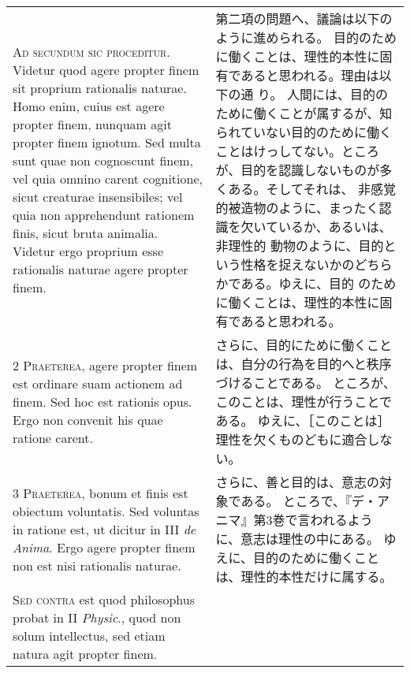 \documentclass[10pt]{jsarticle} %
\begin{document}
\begin{longtable}{p{21em}p{21em}}



{\Huge A}{\scshape d secundum sic proceditur}. Videtur
quod agere propter finem sit proprium rationalis naturae. Homo enim,
cuius est agere propter finem, nunquam agit propter finem ignotum. Sed
multa sunt quae non cognoscunt finem, vel quia omnino carent cognitione,
sicut creaturae insensibiles; vel quia non apprehendunt rationem finis,
sicut bruta animalia. Videtur ergo proprium esse rationalis naturae
agere propter finem.


&


第二項の問題へ、議論は以下のように進められる。
目的のために働くことは、理性的本性に固有であると思われる。理由は以下の通
 り。
人間には、目的のために働くことが属するが、知られていない目的のために働く
 ことはけっしてない。ところが、目的を認識しないものが多くある。そしてそれは、
 非感覚的被造物のように、まったく認識を欠いているか、あるいは、非理性的
 動物のように、目的という性格を捉えないかのどちらかである。ゆえに、目的
 のために働くことは、理性的本性に固有であると思われる。


\\


{\scshape 2 Praeterea}, agere propter finem est
ordinare suam actionem ad finem. Sed hoc est rationis opus. Ergo non
convenit his quae ratione carent.


&


さらに、目的にために働くことは、自分の行為を目的へと秩序づけることである。
ところが、このことは、理性が行うことである。
ゆえに、［このことは］理性を欠くものどもに適合しない。

\\


{\scshape 3 Praeterea}, bonum et finis est obiectum
voluntatis. Sed voluntas in ratione est, ut dicitur in III {\itshape de
Anima}. Ergo agere propter finem non est nisi rationalis naturae.


&

さらに、善と目的は、意志の対象である。
ところで、『デ・アニマ』第3巻で言われるように、意志は理性の中にある。
ゆえに、目的のために働くことは、理性的本性だけに属する。



\\


{\scshape Sed contra} est quod philosophus probat
in II {\itshape Physic}., quod non solum intellectus, sed etiam natura agit propter
finem.



\end{longtable}
\end{document}
